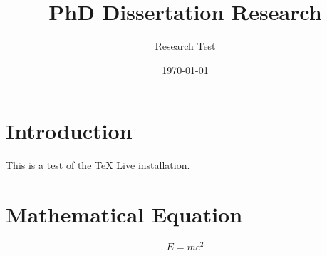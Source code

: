 \documentclass[12pt,letterpaper]{article}
\title{PhD Dissertation Research}
\author{Research Test}
\date{\today}
\begin{document}
\maketitle

\section{Introduction}

This is a test of the TeX Live installation.

\section{Mathematical Equation}

\begin{equation}
E = mc^2
\end{equation}
\end{document}
